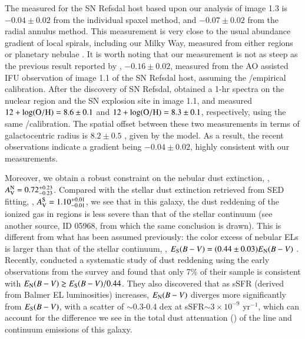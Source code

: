 The measured \mg for the SN Refsdal host based upon our analysis of image 1.3 is $-0.04\pm0.02$ from the individual spaxel method,
and $-0.07\pm0.02$ from the radial annulus method. This measurement is very close to the usual abundance gradient of local 
spirals, including our Milky Way, measured from either \HII regions or planetary nebulae 
\citep{Smartt:1997fm,vanZee:1998cd,Henry:2004ds,Esteban:2015ff}.
It is worth noting that our measurement is not as steep as the previous result reported by \citet{Yuan:2011hj},
\ie $-0.16\pm0.02$, measured from the AO assisted \osiris IFU observation of image 1.1 of the SN Refsdal host, assuming the
\citet{2004MNRAS.348L..59P} \NII/\Ha empirical calibration.  After the discovery of SN Refsdal,
\citet{2015arXiv151209093K} obtained a 1-hr \mosfire spectra on the nuclear region and the SN explosion site in image 1.1, and
measured $12+\log({\rm O/H})=8.6\pm0.1$ and $12+\log({\rm O/H})=8.3\pm0.1$, respectively, using the same \NII/\Ha calibration. The spatial offset between these
two measurements in terms of galactocentric radius is $8.2\pm0.5$ \kpc, given by the \glafic model. As a result, the recent
\mosfire observations indicate a gradient being $-0.04\pm0.02$, highly consistent with our measurements.

Moreover, we obtain a robust constraint on the nebular dust extinction, \ie, $A_{\rm V}^{\rm N}=0.72_{-0.23}^{+0.23}$. Compared with the
stellar dust extinction retrieved from  SED fitting, \ie, $A_{\rm V}^{\rm S}=1.10_{-0.01}^{+0.01}$, we see that in this galaxy, the dust
reddening of the ionized gas in \HII regions is less severe than that of the stellar continuum (see another source, \ie ID 05968,
from which the same conclusion is drawn).  This is different from what has been assumed previously: the color excess of nebular
ELs is larger than that of the stellar continuum, \ie, $E_{\rm S}(B-V)=(0.44\pm0.03)E_{\rm N}(B-V)$ \citep{Calzetti:2000iy}.
Recently, \citet{Reddy:2015ho} conducted a systematic study of dust reddening using the early observations from the \mosdef survey
and found that only 7\% of their sample is consistent with $E_{\rm N}(B-V)\gtrsim E_{\rm S}(B-V)/0.44$. They also discovered that
as sSFR (derived from Balmer EL luminosities) increases, $E_{\rm N}(B-V)$ diverges more significantly from $E_{\rm S}(B-V)$, with
a scatter of $\sim$0.3-0.4 dex at sSFR$\sim3\times10^{-9}$ yr$^{-1}$, which can account for the difference we see in the total
dust attenuation (\Av) of the line and continuum emissions of this galaxy.

